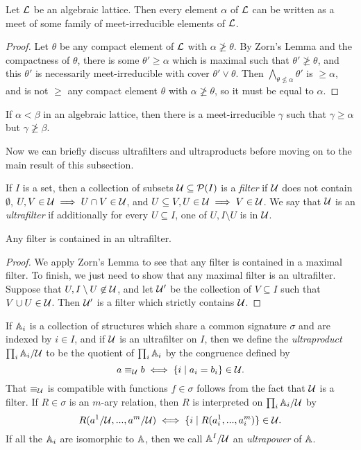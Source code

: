 \documentclass[letterpaper,11pt]{article}
\begin{document}
\begin{prop}\label{meet-irreducible-rep} Let $\mathcal{L}$ be an algebraic lattice. Then every element $\alpha$ of $\mathcal{L}$ can be written as a meet of some family of meet-irreducible elements of $\mathcal{L}$.
\end{prop}
\begin{proof} Let $\theta$ be any compact element of $\mathcal{L}$ with $\alpha \not\ge \theta$. By Zorn's Lemma and the compactness of $\theta$, there is some $\theta' \ge \alpha$ which is maximal such that $\theta' \not\ge \theta$, and this $\theta'$ is necessarily meet-irreducible with cover $\theta' \vee \theta$. Then $\bigwedge_{\theta \not\le \alpha} \theta'$ is $\ge \alpha$, and is not $\ge$ any compact element $\theta$ with $\alpha \not\ge \theta$, so it must be equal to $\alpha$.
\end{proof}

\begin{cor}\label{meet-irreducible} If $\alpha < \beta$ in an algebraic lattice, then there is a meet-irreducible $\gamma$ such that $\gamma \ge \alpha$ but $\gamma \not\ge \beta$.
\end{cor}

Now we can briefly discuss ultrafilters and ultraproducts before moving on to the main result of this subsection.

\begin{defn} If $I$ is a set, then a collection of subsets $\mathcal{U} \subseteq \mathcal{P}(I)$ is a \emph{filter} if $\mathcal{U}$ does not contain $\emptyset$, $U,V \in \mathcal{U} \implies U\cap V \in \mathcal{U}$, and $U \subseteq V, U \in \mathcal{U} \implies V \in \mathcal{U}$. We say that $\mathcal{U}$ is an \emph{ultrafilter} if additionally for every $U \subseteq I$, one of $U, I\setminus U$ is in $\mathcal{U}$.
\end{defn}

\begin{prop} Any filter is contained in an ultrafilter.
\end{prop}
\begin{proof} We apply Zorn's Lemma to see that any filter is contained in a maximal filter. To finish, we just need to show that any maximal filter is an ultrafilter. Suppose that $U, I\setminus U \not\in \mathcal{U}$, and let $\mathcal{U}'$ be the collection of $V \subseteq I$ such that $V\cup U \in \mathcal{U}$. Then $\mathcal{U}'$ is a filter which strictly contains $\mathcal{U}$.
\end{proof}

\begin{defn} If $\mathbb{A}_i$ is a collection of structures which share a common signature $\sigma$ and are indexed by $i \in I$, and if $\mathcal{U}$ is an ultrafilter on $I$, then we define the \emph{ultraproduct} $\prod_i \mathbb{A}_i/\mathcal{U}$ to be the quotient of $\prod_i \mathbb{A}_i$ by the congruence defined by
\[
a \equiv_{\mathcal{U}} b \iff \{i \mid a_i = b_i\} \in \mathcal{U}.
\]
That $\equiv_{\mathcal{U}}$ is compatible with functions $f \in \sigma$ follows from the fact that $\mathcal{U}$ is a filter. If $R \in \sigma$ is an $m$-ary relation, then $R$ is interpreted on $\prod_i \mathbb{A}_i/\mathcal{U}$ by
\[
R(a^1/\mathcal{U}, ..., a^m/\mathcal{U}) \iff \{i \mid R(a^1_i, ..., a^m_i)\} \in \mathcal{U}.
\]
If all the $\mathbb{A}_i$ are isomorphic to $\mathbb{A}$, then we call $\mathbb{A}^I/\mathcal{U}$ an \emph{ultrapower} of $\mathbb{A}$.
\end{defn}
\end{document}
